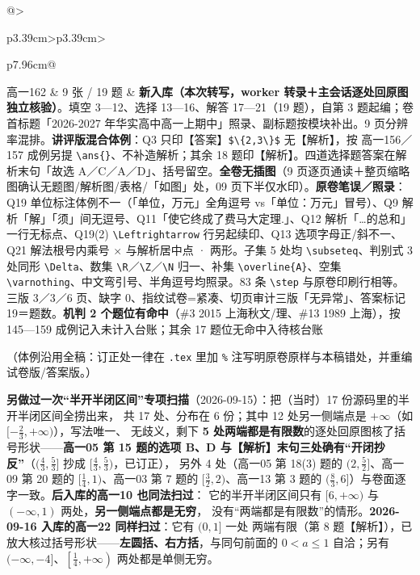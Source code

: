 \documentclass[a4paper,11pt]{article}
\begin{document}
\begin{xltabular}{\textwidth}{@{}>{\raggedright\arraybackslash}p{3.39cm}>{\centering\arraybackslash}p{3.39cm}>{\raggedright\arraybackslash}p{7.96cm}@{}}
高一162 & 9 张 / 19 题 & \textbf{新入库（本次转写，worker 转录＋主会话逐处回原图独立核验）}。填空 3---12、选择 13---16、解答 17---21（19 题），自第 3 题起编；卷首标题「2026-2027 年华实高中高一上期中」照录、副标题按模块补出。9 页分辨率混排。\textbf{讲评版混合体例}：Q3 只印【答案】\texttt{\$\textbackslash{}\{2,3\textbackslash{}\}\$} 无【解析】，按 高一156／157 成例另提 \texttt{\textbackslash{}ans\{\}}、不补造解析；其余 18 题印【解析】。四道选择题答案在解析末句「故选 A／C／A／D」、括号留空。\textbf{全卷无插图}（9 页逐页通读＋整页缩略图确认无题图/解析图/表格/「如图」处，09 页下半仅水印）。\textbf{原卷笔误／照录}：Q19 单位标注体例不一（「单位，万元」全角逗号 vs「单位：万元」冒号）、Q9 解析「解」「须」间无逗号、Q11「使它终成了费马大定理.」、Q12 解析「\ldots 的总和」一行无标点、Q19(2) \texttt{\textbackslash{}Leftrightarrow} 行另起续印、Q13 选项字母正/斜不一、Q21 解法根号内乘号 $\times$ 与解析居中点 · 两形。子集 5 处均 \texttt{\textbackslash{}subseteq}、判别式 3 处同形 \texttt{\textbackslash{}Delta}、数集 \texttt{\textbackslash{}R}／\texttt{\textbackslash{}Z}／\texttt{\textbackslash{}N} 归一、补集 \texttt{\textbackslash{}overline\{A\}}、空集 \texttt{\textbackslash{}varnothing}、中文弯引号、半角逗号均照录。83 条 \texttt{\textbackslash{}step} 与原卷印刷行相等。三版 3／3／6 页、缺字 0、指纹试卷=紧凑、切页审计三版「无异常」、答案标记 19＝题数。\textbf{机判 2 个题位有命中}（\#3 2015 上海秋文/理、\#13 1989 上海），按 145---159 成例记入未计入台账；其余 17 题位无命中入待核台账 \\ \addlinespace[1pt]
\end{xltabular}

（体例沿用全稿：订正处一律在 \texttt{.tex} 里加 \texttt{\%} 注写明原卷原样与本稿错处，并重编试卷版/答案版。）

\textbf{另做过一次``半开半闭区间''专项扫描}（2026-09-15）：把（当时）17 份源码里的半开半闭区间全捞出来，
共 17 处、分布在 6 份；其中 12 处另一侧端点是 \(+\infty\)（如 \([-\frac23,+\infty)\)），写法唯一、
无歧义，剩下 \textbf{5 处两端都是有限数}的逐处回原图核了括号形状------\textbf{高一05 第 15 题的选项 B、D
与【解析】末句三处确有``开闭抄反''}（\((\frac43,\frac53]\) 抄成 \([\frac43,\frac53)\)，已订正），
另外 4 处（高一05 第 18(3) 题的 \((2,\frac52]\)、高一09 第 20 题的 \([\frac14,1)\)、高一03 第 7 题的
\([\frac32,2)\)、高一13 第 3 题的 \((\frac83,6]\)）与卷面逐字一致。\textbf{后入库的高一10 也同法扫过}：
它的半开半闭区间只有 \([6,+\infty)\) 与 \((-\infty,1)\) 两处，\textbf{另一侧端点都是无穷}，
没有``两端都是有限数''的情形。\textbf{2026-09-16 入库的高一22 同样扫过}：它有 \((0,1]\) 一处
两端有限（第 8 题【解析】），已放大核过括号形状------\textbf{左圆括、右方括}，与同句前面的
\(0<a\leqslant1\) 自洽；另有 \((-\infty,-4]\)、\(\left[\frac14,+\infty\right)\) 两处都是单侧无穷。
\end{document}
